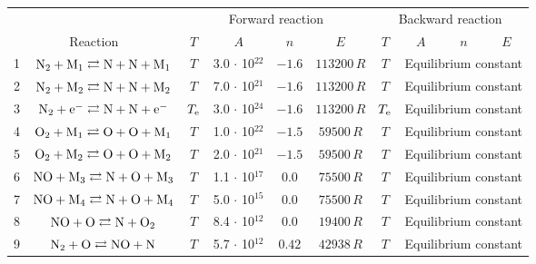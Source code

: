 \documentclass{warpdoc}
\renewcommand{\fontsizetable}{\footnotesize\scalefont{0.9}}
\begin{document}
%
\begin{table}[t]
\fontsizetable
\begin{center}
\begin{threeparttable}
\begin{tabular}{cccccccccc} 
\toprule
~&~&\multicolumn{4}{c}{Forward reaction} & \multicolumn{4}{c}{Backward reaction} \\
 \cmidrule(lr){3-6}\cmidrule(lr){7-10}
\multicolumn{2}{c}{Reaction} & $T$ & $A$ & $n$ & $E$ & $T$  & $A$ & $n$ & $E$ \\ 
\midrule
1 & $\rm N_2 + M_1 \rightleftarrows N + N + M_1$ & $T$   & 3.0 $\cdot$ 10$^{22}$  & $-1.6$ & $113200 \, R$  & $T$ &\multicolumn{3}{c}{Equilibrium constant} \\

2 & $\rm N_2 + M_2 \rightleftarrows N + N + M_2$ & $T$  & 7.0 $\cdot$ 10$^{21}$  & $-1.6$ & $113200 \, R$ & $T$ & \multicolumn{3}{c}{Equilibrium constant}  \\

3 & $\rm N_2 + e^- \rightleftarrows N + N + e^-$ & $T_{\rm e}$ & 3.0 $\cdot$ 10$^{24}$  & $-1.6$ & $113200 \, R$ & $T_{\rm e}$ & \multicolumn{3}{c}{Equilibrium constant} \\

4 & $\rm O_2 + M_1 \rightleftarrows O + O + M_1$ & $T$  & 1.0 $\cdot$ 10$^{22}$  & $-1.5$ & $59500 \, R$ & $T$ & \multicolumn{3}{c}{Equilibrium constant} \\

5 & $\rm O_2 + M_2 \rightleftarrows O + O + M_2$ & $T$  & 2.0 $\cdot$ 10$^{21}$  & $-1.5$ & $59500 \, R$ & $T$ & \multicolumn{3}{c}{Equilibrium constant} \\

6 & $\rm NO + M_3 \rightleftarrows N + O + M_3$ & $T$  & 1.1 $\cdot$ 10$^{17}$  & 0.0 & $75500 \, R$ & $T$ & \multicolumn{3}{c}{Equilibrium constant} \\

7 & $\rm NO + M_4 \rightleftarrows N + O + M_4$ & $T$  & 5.0 $\cdot$ 10$^{15}$  & 0.0 & $75500 \, R$ & $T$ & \multicolumn{3}{c}{Equilibrium constant}  \\

8 & $\rm NO + O \rightleftarrows N + O_2 $ & $T$  & 8.4 $\cdot$ 10$^{12}$  & 0.0 & $19400 \, R$ & $T$ & \multicolumn{3}{c}{Equilibrium constant}  \\

9 & $\rm N_2 + O \rightleftarrows NO + N $ & $T$  & 5.7 $\cdot$ 10$^{12}$  & $0.42$ & $42938 \, R$ & $T$ & \multicolumn{3}{c}{Equilibrium constant} \\


\end{tabular}
\end{threeparttable}
\end{center}
\end{table}
\end{document}
